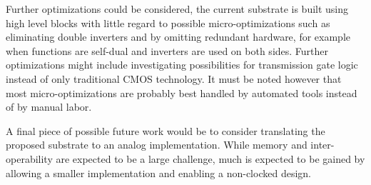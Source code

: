 Further optimizations could be considered, the current substrate is built using high level blocks with little regard to possible micro-optimizations such as eliminating double inverters and by omitting redundant hardware, for example when functions are self-dual and inverters are used on both sides\cite[Section 11.2.2.1]{Weste:2010:CVD:1841628}. Further optimizations might include investigating possibilities for transmission gate logic instead of only traditional \ac{CMOS} technology. It must be noted however that most micro-optimizations are probably best handled by automated tools instead of by manual labor.

A final piece of possible future work would be to consider translating the proposed substrate to an analog implementation. While memory and inter-operability are expected to be a large challenge, much is expected to be gained by allowing a smaller implementation and enabling a non-clocked design.

